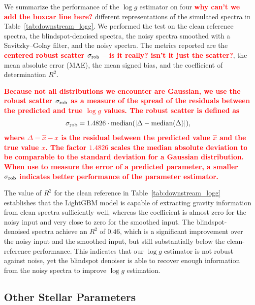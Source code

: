 \documentclass[twocolumn]{aastex7}
\newcommand{\ld}[1]{\textcolor{red}{\textbf{#1}}}
\begin{document}
We summarize the performance of the $\log g$ estimator on four \ld{why can't we add the boxcar line here?} different representations of the simulated spectra in Table~\ref{tab:downstream_logg}. We performed the test on the clean reference spectra, the blindspot-denoised spectra, the noisy spectra smoothed with a Savitzky--Golay filter, and the noisy spectra. The metrics reported are the \ld{centered robust scatter $\sigma_{\rm rob}$ -- is it really? isn't it just the scatter?}, the mean absolute error (MAE), the mean signed bias, and the coefficient of determination $R^{2}$.

\ld{
Because not all distributions we encounter are Gaussian, we use the robust scatter $\sigma_{\rm rob}$ as a measure of the spread of the residuals between the predicted and true $\log g$ values. The robust scatter is defined as
\begin{equation}
    \sigma_{\rm rob} = 1.4826 \cdot \mathrm{median}(|\Delta - \mathrm{median}(\Delta)|),
\end{equation}
where $\Delta = \hat{x} - x$ is the residual between the predicted value $\hat{x}$ and the true value $x$. The factor $1.4826$ scales the median absolute deviation to be comparable to the standard deviation for a Gaussian distribution. When use to measure the error of a predicted parameter, a smaller $\sigma_{\rm rob}$ indicates better performance of the parameter estimator.
}

The value of $R^{2}$ for the clean reference in Table~\ref{tab:downstream_logg} establishes that the LightGBM model is capable of extracting gravity information from clean spectra sufficiently well, whereas the coefficient is almost zero for the noisy input and very close to zero for the smoothed input. The blindspot-denoised spectra achieve an $R^{2}$ of $0.46$, which is a significant improvement over the noisy input and the smoothed input, but still substantially below the clean-reference performance. This indicates that our $\log g$ estimator is not robust against noise, yet the blindspot denoiser is able to recover enough information from the noisy spectra to improve $\log g$ estimation.


\subsection{Other Stellar Parameters}
\end{document}

